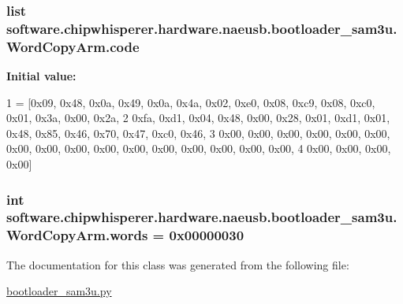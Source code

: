 \subsubsection[{code}]{\setlength{\rightskip}{0pt plus 5cm}list software.\+chipwhisperer.\+hardware.\+naeusb.\+bootloader\+\_\+sam3u.\+Word\+Copy\+Arm.\+code\hspace{0.3cm}{\ttfamily [static]}}\label{classsoftware_1_1chipwhisperer_1_1hardware_1_1naeusb_1_1bootloader__sam3u_1_1WordCopyArm_a8b1b16bf9a66da7029d763029e4b88db}
{\bfseries Initial value\+:}
\begin{DoxyCode}
1 = [0x09, 0x48, 0x0a, 0x49, 0x0a, 0x4a, 0x02, 0xe0, 0x08, 0xc9, 0x08, 0xc0, 0x01, 0x3a, 0x00, 0x2a,
2             0xfa, 0xd1, 0x04, 0x48, 0x00, 0x28, 0x01, 0xd1, 0x01, 0x48, 0x85, 0x46, 0x70, 0x47, 0xc0, 0x46,
3             0x00, 0x00, 0x00, 0x00, 0x00, 0x00, 0x00, 0x00, 0x00, 0x00, 0x00, 0x00, 0x00, 0x00, 0x00, 0x00,
4             0x00, 0x00, 0x00, 0x00]
\end{DoxyCode}
\hypertarget{classsoftware_1_1chipwhisperer_1_1hardware_1_1naeusb_1_1bootloader__sam3u_1_1WordCopyArm_aaebc809a2fc643e3bcc1ebb5644515a2}{}
\subsubsection[{words}]{\setlength{\rightskip}{0pt plus 5cm}int software.\+chipwhisperer.\+hardware.\+naeusb.\+bootloader\+\_\+sam3u.\+Word\+Copy\+Arm.\+words = 0x00000030\hspace{0.3cm}{\ttfamily [static]}}\label{classsoftware_1_1chipwhisperer_1_1hardware_1_1naeusb_1_1bootloader__sam3u_1_1WordCopyArm_aaebc809a2fc643e3bcc1ebb5644515a2}


The documentation for this class was generated from the following file\+:\begin{DoxyCompactItemize}
\item 
\hyperlink{bootloader__sam3u_8py}{bootloader\+\_\+sam3u.\+py}\end{DoxyCompactItemize}
